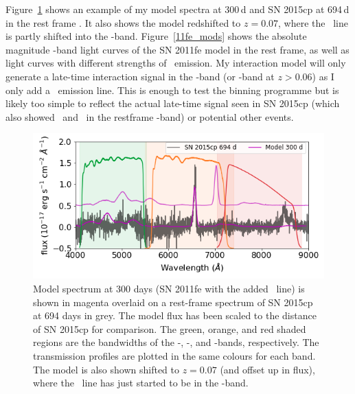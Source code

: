 \documentclass[a4paper,oneside,12pt, class=Latex/Classes/PhDthesisPSnPDF, crop=false]{standalone}
\begin{document}
Figure~\ref{mod_15cp_comp} shows an example of my model spectra at 300\,d and SN 2015cp at 694\,d in the rest frame \citep{2015cp}. It also shows the model redshifted to $z = 0.07$, where the \Halpha~line is partly shifted into the \ztfi-band. Figure~\ref{11fe_mods} shows the absolute magnitude \ztfr\ztfi-band light curves of the SN 2011fe model in the rest frame, as well as light curves with different strengths of \Halpha~emission. My interaction model will only generate a late-time interaction signal in the \ztfr-band (or \ztfi-band at $z > 0.06$) as I only add a \Halpha\ emission line. This is enough to test the binning programme but is likely too simple to reflect the actual late-time signal seen in SN 2015cp (which also showed \OI\ and \CaII\ in the restframe \ztfi-band) or potential other events.


\begin{figure}
 \centering
 \includegraphics[width=\textwidth]{../Images/chapter_3/Model_15cp_comparison.png}
 \caption{Model spectrum at 300 days (SN 2011fe with the added \Halpha~line) is shown in magenta overlaid on a rest-frame spectrum of SN 2015cp at 694 days in grey. The model flux has been scaled to the distance of SN 2015cp for comparison. The green, orange, and red shaded regions are the bandwidths of the \ztfg-, \ztfr-, and \ztfi-bands, respectively. The transmission profiles are plotted in the same colours for each band. The model is also shown shifted to $z = 0.07$ (and offset up in flux), where the \Halpha~line has just started to be in the \ztfi-band.}
 \label{mod_15cp_comp}
\end{figure}
\end{document}
